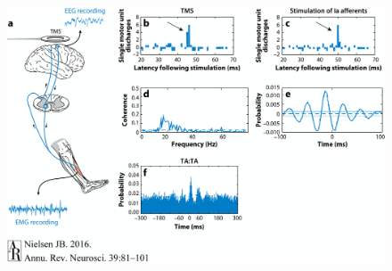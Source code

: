 \documentclass[
  letterpaper,
  DIV=11,
  numbers=noendperiod]{scrartcl}
\begin{document}
\begin{figure}[H]

{\centering \includegraphics{action_files/mediabag/ne390081.f1.gif}

}


\end{figure}
\end{document}
